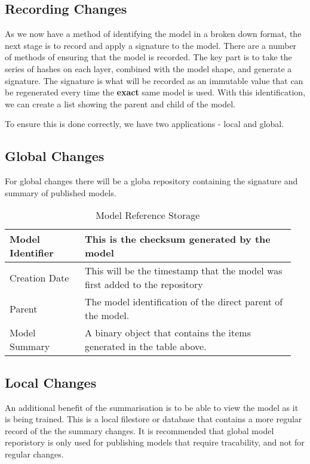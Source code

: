 \subsection{Recording Changes}
As we now have a method of identifying the model in a broken down format, the next stage is to record and apply a signature to the model. There are a number of methods of ensuring that the model is recorded. The key part is to take the series of hashes on each layer, combined with the model shape, and generate a signature. The signature is what will be recorded as an immutable value that can be regenerated every time the \textbf{exact} same model is used. With this identification, we can create a list showing the parent and child of the model.

To ensure this is done correctly, we have two applications - local and global.
\subsection{Global Changes}
For global changes there will be a globa repository containing the signature and summary of published models. 

\begin{table}[h]
\caption{Model Reference Storage}

\begin{tabular}{| p{0.25\linewidth} | p{0.7\linewidth} |}
    \hline
    Model Identifier    & This is the checksum generated by the model \\
    \hline
    Creation Date       & This will be the timestamp that the model was first added to the repository \\
    \hline
    Parent              & The model identification of the direct parent of the model. \\
    \hline
    Model Summary       & A binary object that contains the items generated in the table above. \\
    \hline 
    
\end{tabular}
\end{table}

\subsection{Local Changes}

An additional benefit of the summarisation is to be able to view the model as it is being trained. This is a local filestore or database that contains a more regular record of the the summary changes. It is recommended that global model reporistory is only used for publishing models that require tracability, and not for regular changes.

